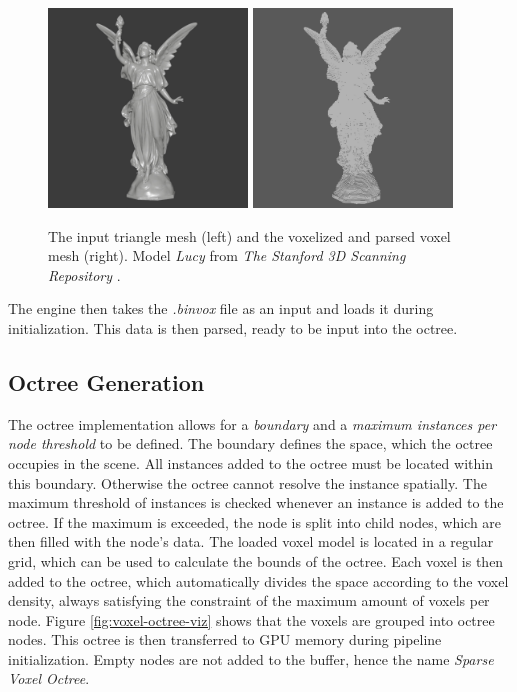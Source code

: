 \begin{figure}[h]
    \centering
    \includegraphics[width=200px]{images/graphics/lucy-triangle-mesh.jpg}
    \includegraphics[width=200px]{images/graphics/lucy-voxel-mesh.jpg}
    \caption{The input triangle mesh (left) and the voxelized and parsed voxel mesh (right). 
    Model \emph{Lucy} from \emph{The Stanford 3D Scanning Repository} \cite{Stanford23}.}
    \label{fig:trimesh-to-voxel-mesh}
\end{figure}

\noindent
The engine then takes the \emph{.binvox} file as an input and loads it during initialization. This data is then
parsed, ready to be input into the octree.


\subsection*{Octree Generation} \label{subsec-octree-generation}

The octree implementation allows for a \emph{boundary} and a \emph{maximum instances per node threshold} to be 
defined. The boundary defines the space, which the octree occupies in the scene. All instances added to the octree 
must be located within this boundary. Otherwise the octree cannot resolve the instance spatially. The maximum 
threshold of instances is checked whenever an instance is added to the octree. If the maximum is exceeded, the 
node is split into child nodes, which are then filled with the node's data. The loaded voxel model is located in 
a regular grid, which can be used to calculate the bounds of the octree. Each voxel is then added to the octree, 
which automatically divides the space according to the voxel density, always satisfying the constraint of the 
maximum amount of voxels per node. Figure \ref{fig:voxel-octree-viz} shows that the voxels are grouped into 
octree nodes. This octree is then transferred to \ac{GPU} memory during pipeline initialization. Empty nodes are 
not added to the buffer, hence the name \emph{Sparse Voxel Octree}. 


